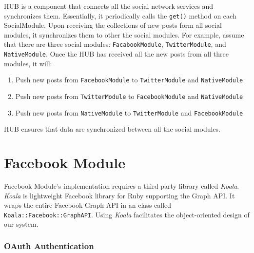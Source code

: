 HUB is a component that connects all the social network services and synchronizes them. Essentially, it periodically calls the \texttt{get()} method on each SocialModule. Upon receiving the collections of new posts form all social modules, it synchronizes them to other the social modules. For example, assume that there are three social modules: \texttt{FacabookModule}, \texttt{TwitterModule}, and \texttt{NativeModule}. Once the HUB has received all the new posts from all three modules, it will:
\begin{enumerate}
	\item Push new posts from \texttt{FacebookModule} to \texttt{TwitterModule} and \texttt{NativeModule}
	\item Push new posts from \texttt{TwitterModule} to \texttt{FacebookModule} and \texttt{NativeModule}
	\item Push new posts from \texttt{NativeModule} to \texttt{TwitterModule} and \texttt{FacebookModule}
\end{enumerate}

HUB ensures that data are synchronized between all the social modules.


\section{Facebook Module} %
\label{sec:facebook_module}

Facebook Module's implementation requires a third party library called \emph{Koala}. \emph{Koala} is lightweight Facebook library for Ruby supporting the Graph API. It wraps the entire Facebook Graph API in an class called \texttt{Koala::Facebook::GraphAPI}. Using \emph{Koala} facilitates the object-oriented design of our system.

\subsubsection{OAuth Authentication} %
\label{ssub:oauth_authentication}


